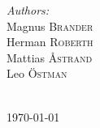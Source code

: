 \begin{titlepage}
\begin{minipage}{0.4\textwidth}
\begin{flushleft} \large
\emph{Authors:}\\
Magnus \textsc{Brander}\\ 
Herman \textsc{Roberth}\\ 
Mattias \textsc{Åstrand}\\ 
Leo \textsc{Östman}\\ 
\end{flushleft}

\end{minipage}\\[2cm]



{\large \today}\\[2cm] 

\vfill 

\end{titlepage}
